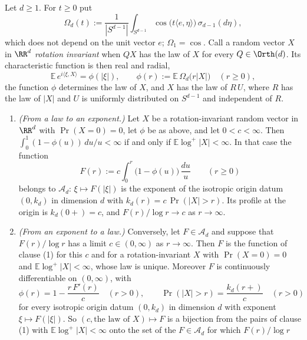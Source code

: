 \begin{proposition}
\label{prop:radial-dictionary}
Let $d \ge 1$. For $t \ge 0$ put
\[
  \Omega_d(t) := \frac{1}{|S^{d-1}|}\int_{S^{d-1}}\cos\bigl(t\langle e,\eta\rangle\bigr)\,
     \sigma_{d-1}(d\eta) ,
\]
which does not depend on the unit vector $e$; $\Omega_1 = \cos$. Call a random vector $X$ in
$\RR^d$ \emph{rotation invariant} when $QX$ has the law of $X$ for every $Q \in \Orth(d)$. Its
characteristic function is then real and radial,
\[
  \mathbb{E}\,e^{i\langle\xi,X\rangle} = \phi(|\xi|), \qquad
  \phi(r) := \mathbb{E}\,\Omega_d\bigl(r|X|\bigr) \quad (r \ge 0) ,
\]
the function $\phi$ determines the law of $X$, and $X$ has the law of $R\,U$, where $R$ has the
law of $|X|$ and $U$ is uniformly distributed on $S^{d-1}$ and independent of $R$.
\begin{enumerate}
\item \emph{(From a law to an exponent.)} Let $X$ be a rotation-invariant random vector in
$\RR^d$ with $\Pr(X = 0) = 0$, let $\phi$ be as above, and let $0 < c < \infty$. Then
$\int_0^1 (1 - \phi(u))\,du/u < \infty$ if and only if $\mathbb{E}\log^+|X| < \infty$. In that
case the function
\[
  F(r) := c\int_0^r \bigl(1 - \phi(u)\bigr)\,\frac{du}{u} \qquad (r \ge 0)
\]
belongs to $\mathcal{A}_d$: $\xi \mapsto F(|\xi|)$ is the exponent of the isotropic origin datum
$(0,k_d)$ in dimension $d$ with $k_d(r) = c\,\Pr(|X| > r)$. Its profile at the origin is
$k_d(0{+}) = c$, and $F(r)/\log r \to c$ as $r \to \infty$.
\item \emph{(From an exponent to a law.)} Conversely, let $F \in \mathcal{A}_d$ and suppose that
$F(r)/\log r$ has a limit $c \in (0,\infty)$ as $r \to \infty$. Then $F$ is the function of
clause (1) for this $c$ and for a rotation-invariant $X$ with $\Pr(X = 0) = 0$ and
$\mathbb{E}\log^+|X| < \infty$, whose law is unique. Moreover $F$ is continuously differentiable
on $(0,\infty)$, with
\[
  \phi(r) = 1 - \frac{r\,F'(r)}{c} \quad (r > 0), \qquad
  \Pr(|X| > r) = \frac{k_d(r{+})}{c} \quad (r > 0)
\]
for every isotropic origin datum $(0,k_d)$ in dimension $d$ with exponent $\xi \mapsto F(|\xi|)$.
So $(c, \text{the law of } X) \mapsto F$ is a bijection from the pairs of clause (1) with
$\mathbb{E}\log^+|X| < \infty$ onto the set of the $F \in \mathcal{A}_d$ for which $F(r)/\log r$

\end{enumerate}
\end{proposition}
